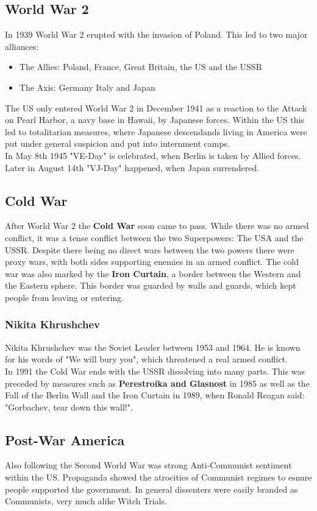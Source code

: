 \documentclass{article}
\begin{document}
	\subsection{World War 2}
	In 1939 World War 2 erupted with the invasion of Poland. This led to two major alliances:
	\begin{itemize}
		\item{The Allies: Poland, France, Great Britain, the US and the USSR}
		\item{The Axis: Germany Italy and Japan}
	\end{itemize}
	The US only entered World War 2 in December 1941 as a reaction to the Attack on Pearl Harbor, a navy base in Hawaii, by Japanese forces. Within the US this led to totalitarian measures, where Japanese descendands living in America were put under general suspicion and put into internment camps. \\
	In May 8th 1945 "VE-Day" is celebrated, when Berlin is taken by Allied forces. Later in August 14th "VJ-Day" happened, when Japan surrendered. \\
	\subsection{Cold War}
	After World War 2 the \textbf{Cold War} soon came to pass. While there was no armed conflict, it was a tense conflict between the two Superpowers: The USA and the USSR. Despite there being no direct wars between the two powers there were proxy wars, with both sides supporting enemies in an armed conflict. The cold war was also marked by the \textbf{Iron Curtain}, a border between the Western and the Eastern sphere. This border was guarded by walls and guards, which kept people from leaving or entering. \\
	\subsubsection{Nikita Khrushchev}
	Nikita Khrushchev was the Soviet Leader between 1953 and 1964. He is known for his words of "We will bury you", which threatened a real armed conflict. \\
	In 1991 the Cold War ends with the USSR dissolving into many parts. This was preceded by measures such as \textbf{Perestroika and Glasnost} in 1985 as well as the Fall of the Berlin Wall and the Iron Curtain in 1989, when Ronald Reagan said: "Gorbachev, tear down this wall!". \\
	\subsection{Post-War America}
	Also following the Second World War was strong Anti-Communist sentiment within the US. Propaganda showed the atrocities of Communist regimes to esnure people supported the government. In general dissenters were easily branded as Communists, very much alike Witch Trials. \\
\end{document}

